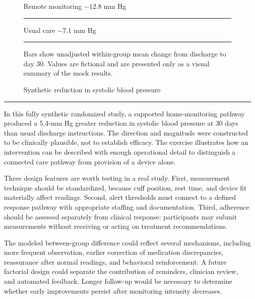 \documentclass[9pt,twocolumn]{article}
\newcommand{\articleSection}[1]{%
  \par\vspace{5pt}%
  \noindent{\large\bfseries\color{journalblue}#1}\par\vspace{1pt}%
  \noindent\textcolor{journalblue}{\rule{\columnwidth}{0.45pt}}\par\vspace{2pt}%
}
\begin{document}
\begin{figure}[h]
\centering
\caption{Synthetic reduction in systolic blood pressure}
\vspace{2pt}
\begin{minipage}{0.94\columnwidth}
\scriptsize
Remote monitoring \hfill $-12.8$ mm Hg\par
\textcolor{journalblue}{\rule{0.92\linewidth}{9pt}}\par\vspace{5pt}
Usual care \hfill $-7.1$ mm Hg\par
\textcolor{textgray}{\rule{0.51\linewidth}{9pt}}\par\vspace{5pt}
{\tiny Bars show unadjusted within-group mean change from discharge to day 30. Values are fictional and are presented only as a visual summary of the mock results.}
\end{minipage}
\end{figure}

\clearpage

\articleSection{Discussion}

In this fully synthetic randomized study, a supported home-monitoring pathway produced a 5.4-mm Hg greater reduction in systolic blood pressure at 30 days than usual discharge instructions. The direction and magnitude were constructed to be clinically plausible, not to establish efficacy. The exercise illustrates how an intervention can be described with enough operational detail to distinguish a connected care pathway from provision of a device alone.

Three design features are worth testing in a real study. First, measurement technique should be standardized, because cuff position, rest time, and device fit materially affect readings. Second, alert thresholds must connect to a defined response pathway with appropriate staffing and documentation. Third, adherence should be assessed separately from clinical response: participants may submit measurements without receiving or acting on treatment recommendations.

The modeled between-group difference could reflect several mechanisms, including more frequent observation, earlier correction of medication discrepancies, reassurance after normal readings, and behavioral reinforcement. A future factorial design could separate the contribution of reminders, clinician review, and automated feedback. Longer follow-up would be necessary to determine whether early improvements persist after monitoring intensity decreases.
\end{document}
